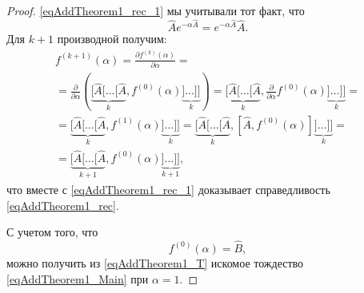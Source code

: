 \begin{theorem}
\begin{proof}
\eqref{eqAddTheorem1_rec_1} мы учитывали тот факт, что 
\begin{equation}
\hat{A}e^{-\alpha\hat{A}} = e^{-\alpha\hat{A}} \hat{A}.
\nonumber
\end{equation}
Для $k+1$ производной получим:
\begin{eqnarray}
f^{(k + 1)}\left(\alpha\right) = 
\frac{\partial f^{(k)}\left(\alpha\right)}{\partial \alpha} =
\nonumber \\
=\frac{\partial }{\partial \alpha}
\left(
\underbrace{
[\hat{A}[\dots[\hat{A}}_{k},
f^{(0)}\left(\alpha\right)
\underbrace{]\dots]]}_{k} \right) =  
\underbrace{
[\hat{A}[\dots[\hat{A}}_{k},
\frac{\partial }{\partial \alpha}f^{(0)}\left(\alpha\right)
\underbrace{]\dots]]}_{k} =
\nonumber \\
= 
\underbrace{
[\hat{A}[\dots[\hat{A}}_{k},
f^{(1)}\left(\alpha\right)
\underbrace{]\dots]]}_{k} =
\underbrace{
[\hat{A}[\dots[\hat{A}}_{k},
\left[\hat{A}, f^{(0)}\left(\alpha\right)\right]
\underbrace{]\dots]]}_{k} =
\nonumber \\
=
\underbrace{
[\hat{A}[\dots[\hat{A}}_{k + 1},
f^{(0)}\left(\alpha\right)
\underbrace{]\dots]]}_{k + 1},
\nonumber
\end{eqnarray}
что вместе с \eqref{eqAddTheorem1_rec_1} доказывает справедливость 
\eqref{eqAddTheorem1_rec}.

С учетом того, что 
\begin{equation}
f^{(0)}\left(\alpha\right) = \hat{B},
\nonumber
\end{equation}
можно получить из \eqref{eqAddTheorem1_T} искомое тождество
\eqref{eqAddTheorem1_Main} при $\alpha = 1$. 
\end{proof}
\end{theorem}

